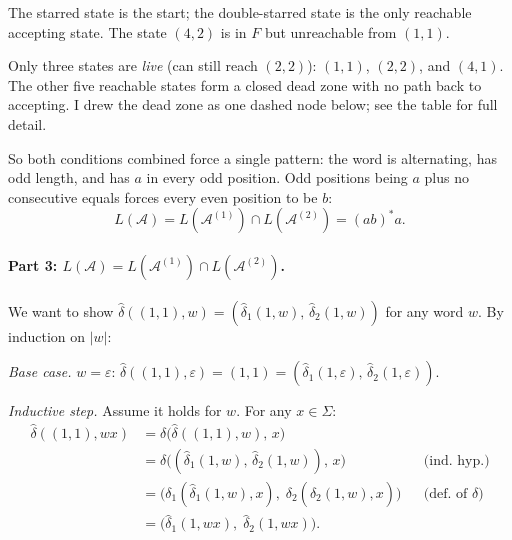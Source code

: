 \documentclass{article}
\theoremstyle{theorem}
\theoremstyle{definition}
\theoremstyle{remark}
\begin{document}
The starred state is the start; the double-starred state is the only reachable accepting state. The state $(4, 2)$ is in $F$ but unreachable from $(1, 1)$.

Only three states are \emph{live} (can still reach $(2, 2)$): $(1, 1)$, $(2, 2)$, and $(4, 1)$. The other five reachable states form a closed dead zone with no path back to accepting. I drew the dead zone as one dashed node below; see the table for full detail.

\begin{center}
\end{center}

So both conditions combined force a single pattern: the word is alternating, has odd length, and has $a$ in every odd position. Odd positions being $a$ plus no consecutive equals forces every even position to be $b$:
\[
  L(\mathcal{A}) = L(\mathcal{A}^{(1)}) \cap L(\mathcal{A}^{(2)}) = (ab)^* a.
\]

\paragraph{Part 3: $L(\mathcal{A}) = L(\mathcal{A}^{(1)}) \cap L(\mathcal{A}^{(2)})$.}

We want to show $\hat\delta((1,1), w) = (\hat\delta_1(1, w),\, \hat\delta_2(1, w))$ for any word $w$. By induction on $|w|$:

\emph{Base case.} $w = \varepsilon$: $\hat\delta((1,1),\varepsilon) = (1,1) = (\hat\delta_1(1,\varepsilon),\, \hat\delta_2(1,\varepsilon))$. \checkmark

\emph{Inductive step.} Assume it holds for $w$. For any $x \in \Sigma$:
\begin{align*}
  \hat\delta((1,1), wx)
    &= \delta\bigl(\hat\delta((1,1), w),\, x\bigr) \\
    &= \delta\bigl((\hat\delta_1(1, w),\, \hat\delta_2(1, w)),\, x\bigr)
       && \text{(ind.\ hyp.)} \\
    &= \bigl(\delta_1(\hat\delta_1(1, w), x),\; \delta_2(\hat\delta_2(1, w), x)\bigr)
       && \text{(def.\ of } \delta \text{)} \\
    &= \bigl(\hat\delta_1(1, wx),\; \hat\delta_2(1, wx)\bigr).
\end{align*}
\end{document}
